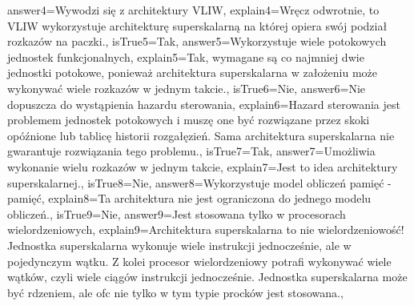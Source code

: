 \begin{enumerate}
\begin{minipage}{\textwidth}
{		answer4={Wywodzi się z architektury VLIW},%
		explain4={Wręcz odwrotnie, to VLIW wykorzystuje architekturę superskalarną na której opiera swój podział rozkazów na paczki.},%
		isTrue5={Tak},%
		answer5={Wykorzystuje wiele potokowych jednostek funkcjonalnych},%
		explain5={Tak, wymagane są co najmniej dwie jednostki potokowe, ponieważ architektura superskalarna w założeniu może wykonywać wiele rozkazów w jednym takcie.},%
		isTrue6={Nie},%
		answer6={Nie dopuszcza do wystąpienia hazardu sterowania},%
		explain6={Hazard sterowania jest problemem jednostek potokowych i muszę one być rozwiązane przez skoki opóźnione lub tablicę historii rozgałęzień. Sama architektura superskalarna nie gwarantuje rozwiązania tego problemu.},%
		isTrue7={Tak},%
		answer7={Umożliwia wykonanie wielu rozkazów w jednym takcie},%
		explain7={Jest to idea architektury superskalarnej.},%
		isTrue8={Nie},%
		answer8={Wykorzystuje model obliczeń pamięć - pamięć},%
		explain8={Ta architektura nie jest ograniczona do jednego modelu obliczeń.},%
		isTrue9={Nie},%
		answer9={Jest stosowana tylko w procesorach wielordzeniowych},%
		explain9={Architektura superskalarna to nie wielordzeniowość! Jednostka superskalarna wykonuje wiele instrukcji jednocześnie, ale w pojedynczym wątku. Z kolei procesor wielordzeniowy potrafi wykonywać wiele wątków, czyli wiele ciągów instrukcji jednocześnie. Jednostka superskalarna może być rdzeniem, ale ofc nie tylko w tym typie procków jest stosowana.},%
	}
\end{minipage}
\begin{minipage}{\textwidth}
\end{minipage}
\end{enumerate}
